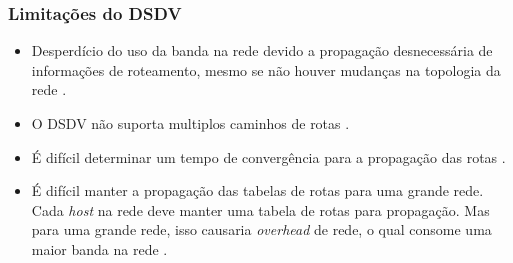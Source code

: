 \subsubsection{Limita\c{c}\~ oes do DSDV}
\begin{itemize}
	\item Desperd\'icio do uso da banda na rede devido a propaga\c{c}\~ao desnecess\'aria de informa\c{c}\~oes de roteamento, mesmo se n\~ao houver mudan\c{c}as na topologia da rede \cite{Patel00energyin}.	
	\item O DSDV n\~ao suporta multiplos caminhos de rotas \cite{gorantala}.
	\item \'E dif\'icil determinar um tempo de converg\^encia para a propaga\c{c}\~ao das rotas \cite{heg}.
	\item \'E dif\'icil manter a propaga\c{c}\~ao das tabelas de rotas para uma grande rede. Cada \textit{host} na rede deve manter uma tabela de rotas para propaga\c{c}\~ao. Mas para uma grande rede, isso causaria \textit{overhead} de rede, o qual consome uma maior banda na rede \cite{gorantala}.
\end{itemize}
